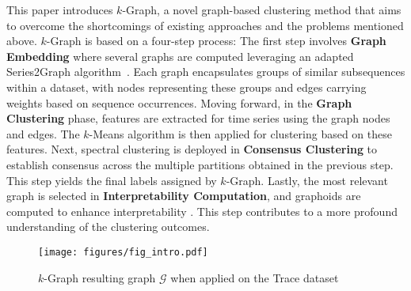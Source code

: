 This paper introduces $k$-Graph, a novel graph-based  clustering method that aims to overcome the shortcomings of existing approaches and the problems mentioned above. 
$k$-Graph is based on a four-step process: The first step involves \textbf{Graph Embedding} where several graphs are computed leveraging an adapted Series2Graph algorithm~\cite{Series2GraphPaper}. Each graph encapsulates groups of similar subsequences within a dataset, with nodes representing these groups and edges carrying weights based on sequence occurrences. Moving forward, in the \textbf{Graph Clustering} phase, features are extracted for time series using the graph nodes and edges. The $k$-Means algorithm is then applied for clustering based on these features. Next, spectral clustering is deployed in \textbf{Consensus Clustering} to establish consensus across the multiple partitions obtained in the previous step. This step yields the final labels assigned by $k$-Graph. Lastly, the most relevant graph is selected in \textbf{Interpretability Computation}, and graphoids are computed to enhance interpretability . This step contributes to a more profound understanding of the clustering outcomes.

\begin{figure}[tb]
 \centering
\texttt{[image: figures/fig\_intro.pdf]}
 \caption{$k$-Graph resulting graph $\mathcal{G}$ when applied on the Trace dataset~\cite{Dau2018TheUT}}
 \vspace{-0.3cm}
 \label{fig:intro}
\end{figure}

